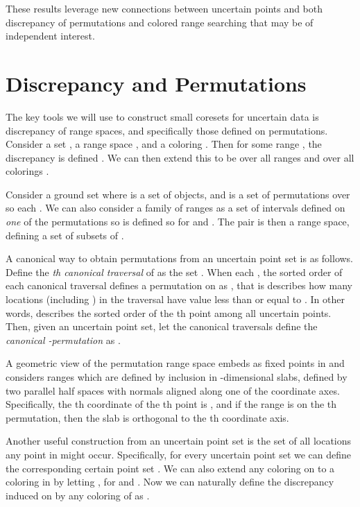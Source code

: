 \documentclass[11pt]{myclass}
\begin{document}
These results leverage new connections between uncertain points and both discrepancy of permutations and colored range searching that may be of independent interest.  

\section{Discrepancy and Permutations}

The key tools we will use to construct small coresets for uncertain data is discrepancy of range spaces, and specifically those defined on permutations.  
Consider a set , a range space , and a coloring .  
Then for some range , the discrepancy is defined 
.  We can then extend this to be over all ranges  and over all colorings .  

Consider a ground set  where  is a set of  objects, and  is a set of  permutations over  so each .  We can also consider a family of ranges  as a set of intervals defined on \emph{one} of the  permutations so  is defined so  for  and . The pair  is then a range space, defining a set of subsets of .  

A canonical way to obtain  permutations from an uncertain point set  is as follows.  
Define the \emph{th canonical traversal} of  as the set . When each , the sorted order of each canonical traversal  defines a permutation on  as , that is  describes how many locations (including ) in the traversal  have value less than or equal to .  In other words,  describes the sorted order of the th point among all uncertain points.  Then, given an uncertain point set, let the canonical traversals define the \emph{canonical -permutation} as .  

A geometric view of the permutation range space embeds  as  fixed points in  and considers ranges which are defined by inclusion in -dimensional slabs, defined by two parallel half spaces with normals aligned along one of the coordinate axes.  Specifically, the th coordinate of the th point is , and if the range is on the th permutation, then the slab is orthogonal to the th coordinate axis.  

Another useful construction from an uncertain point set  is the set  of all locations any point in  might occur.  
Specifically, for every uncertain point set  we can define the corresponding certain point set . 
We can also extend any coloring  on  to a coloring in  by letting , for  and .  
Now we can naturally define the discrepancy induced on  by any coloring  of  as 
.
\end{document}
